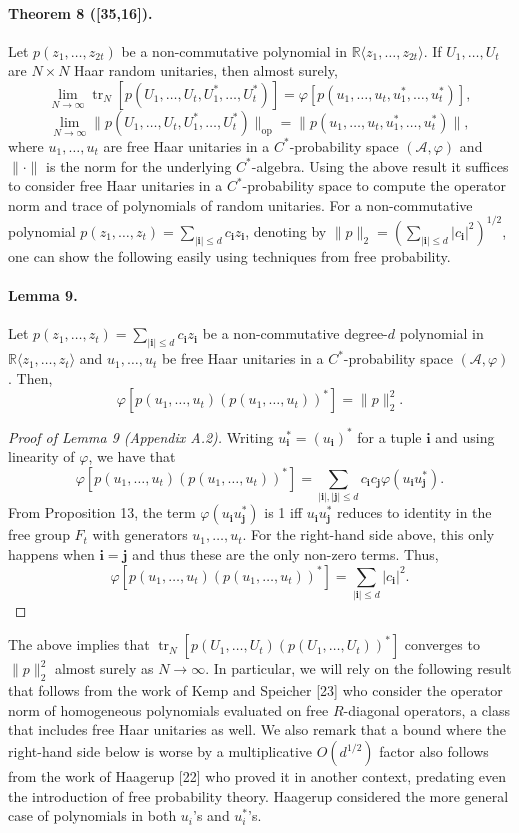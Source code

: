 \documentclass[10pt,a4paper]{article}
\begin{document}
\paragraph{Theorem 8 ([35,16]).}
Let $p(z_1,\ldots,z_{2t})$ be a non-commutative polynomial in $\mathbb R\langle z_1,\ldots,z_{2t}\rangle$. If $U_1,\ldots,U_t$ are $N\times N$ Haar random unitaries, then almost surely,
\[\lim_{N\to\infty}\operatorname{tr}_N[p(U_1,\ldots,U_t,U_1^*,\ldots,U_t^*)]=\varphi[p(u_1,\ldots,u_t,u_1^*,\ldots,u_t^*)],\]
\[\lim_{N\to\infty}\|p(U_1,\ldots,U_t,U_1^*,\ldots,U_t^*)\|_{\mathrm{op}}=\|p(u_1,\ldots,u_t,u_1^*,\ldots,u_t^*)\|,\]
where $u_1,\ldots,u_t$ are free Haar unitaries in a $C^*$-probability space $(\mathcal A,\varphi)$ and $\|\cdot\|$ is the norm for the underlying $C^*$-algebra.
Using the above result it suffices to consider free Haar unitaries in a $C^*$-probability space to compute the operator norm and trace of polynomials of random unitaries. For a non-commutative polynomial $p(z_1,\ldots,z_t)=\sum_{|\mathbf i|\leq d}c_{\mathbf i}z_{\mathbf i}$, denoting by $\|p\|_2=(\sum_{|\mathbf i|\leq d}|c_{\mathbf i}|^2)^{1/2}$, one can show the following easily using techniques from free probability.
\paragraph{Lemma 9.}
Let $p(z_1,\ldots,z_t)=\sum_{|\mathbf i|\leq d}c_{\mathbf i}z_{\mathbf i}$ be a non-commutative degree-$d$ polynomial in $\mathbb R\langle z_1,\ldots,z_t\rangle$ and $u_1,\ldots,u_t$ be free Haar unitaries in a $C^*$-probability space $(\mathcal A,\varphi)$. Then,
\[\varphi[p(u_1,\ldots,u_t)(p(u_1,\ldots,u_t))^*]=\|p\|_2^2.\]
\begin{proof}[Proof of Lemma 9 (Appendix A.2)]
Writing $u_{\mathbf i}^*=(u_{\mathbf i})^*$ for a tuple $\mathbf i$ and using linearity of $\varphi$, we have that
\[\varphi[p(u_1,\ldots,u_t)(p(u_1,\ldots,u_t))^*]=\sum_{|\mathbf i|,|\mathbf j|\leq d}c_{\mathbf i}c_{\mathbf j}\varphi(u_{\mathbf i}u_{\mathbf j}^*).\]
From Proposition 13, the term $\varphi(u_{\mathbf i}u_{\mathbf j}^*)$ is 1 iff $u_{\mathbf i}u_{\mathbf j}^*$ reduces to identity in the free group $F_t$ with generators $u_1,\ldots,u_t$. For the right-hand side above, this only happens when $\mathbf i=\mathbf j$ and thus these are the only non-zero terms. Thus,
\[\varphi[p(u_1,\ldots,u_t)(p(u_1,\ldots,u_t))^*]=\sum_{|\mathbf i|\leq d}|c_{\mathbf i}|^2.\]
\end{proof}
The above implies that $\operatorname{tr}_N[p(U_1,\ldots,U_t)(p(U_1,\ldots,U_t))^*]$ converges to $\|p\|_2^2$ almost surely as $N\to\infty$.
In particular, we will rely on the following result that follows from the work of Kemp and Speicher [23] who consider the operator norm of homogeneous polynomials evaluated on free $R$-diagonal operators, a class that includes free Haar unitaries as well. We also remark that a bound where the right-hand side below is worse by a multiplicative $O(d^{1/2})$ factor also follows from the work of Haagerup [22] who proved it in another context, predating even the introduction of free probability theory. Haagerup considered the more general case of polynomials in both $u_i$'s and $u_i^*$'s.
\end{document}
